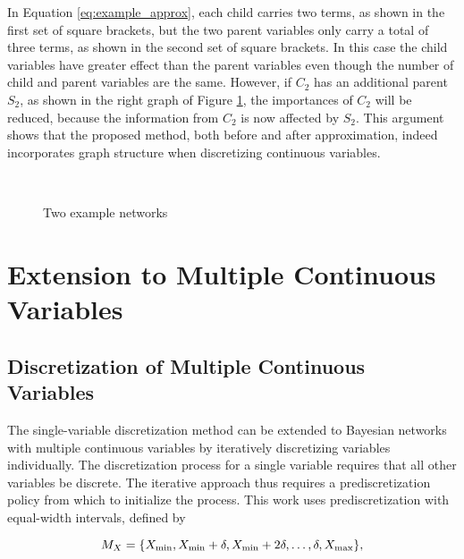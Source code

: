 In Equation \ref{eq:example_approx}, each child carries two terms, as shown in the first set of square brackets, but the two parent variables only carry a total of three terms, as shown in the second set of square brackets.
In this case the child variables have greater effect than the parent variables even though the number of child and parent variables are the same.
However, if $C_2$ has an additional parent $S_2$, as shown in the right graph of Figure \ref{fig:example_networks}, the importances of $C_2$ will be reduced, because the information from $C_2$ is now affected by $S_2$.
This argument shows that the proposed method, both before and after approximation, indeed incorporates graph structure when discretizing continuous variables.

\begin{figure}[ht]
  \label{fig:example_networks}
  \begin{tabular}{cc}
    
    \end{tabular}
   \hspace{5em}
    \begin{tabular}{cc}
    
  \end{tabular}
  \caption{Two example networks}
\end{figure}


\section{Extension to Multiple Continuous Variables}
\label{sec:multi_var}

\subsection{Discretization of Multiple Continuous Variables}

The single-variable discretization method can be extended to Bayesian networks with multiple continuous variables by iteratively discretizing variables individually.
The discretization process for a single variable requires that all other variables be discrete.
The iterative approach thus requires a prediscretization policy from which to initialize the process.
This work uses prediscretization with equal-width intervals, defined by

\begin{equation}
M_X = \curly{X_\text{min}, X_\text{min} + \delta, X_\text{min} + 2\delta, \ldots, \delta, X_\text{max}}\text{,}
\end{equation}

